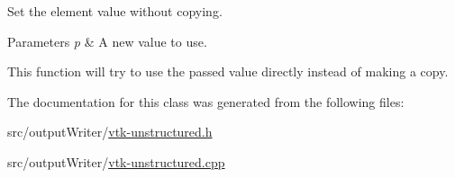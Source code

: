 Set the element value without copying. 


\begin{DoxyParams}{Parameters}
{\em p} & A new value to use.\\
\hline
\end{DoxyParams}
This function will try to use the passed value directly instead of making a copy. 

The documentation for this class was generated from the following files\-:\begin{DoxyCompactItemize}
\item 
src/output\-Writer/\hyperlink{vtk-unstructured_8h}{vtk-\/unstructured.\-h}\item 
src/output\-Writer/\hyperlink{vtk-unstructured_8cpp}{vtk-\/unstructured.\-cpp}\end{DoxyCompactItemize}
